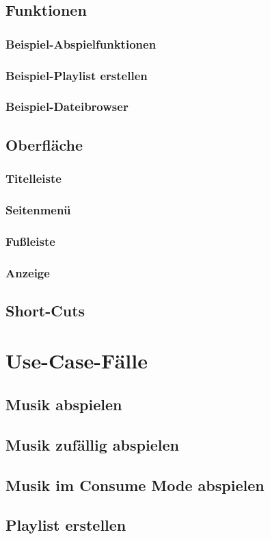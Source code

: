 \subsection{Funktionen}
\subsubsection{Beispiel-Abspielfunktionen}
\subsubsection{Beispiel-Playlist erstellen}
\subsubsection{Beispiel-Dateibrowser}
\subsection{Oberfläche}
\subsubsection{Titelleiste}
\subsubsection{Seitenmenü}
\subsubsection{Fußleiste}
\subsubsection{Anzeige}
\subsection{Short-Cuts}
\section{Use-Case-Fälle}
\subsection{Musik abspielen}
\subsection{Musik zufällig abspielen}
\subsection{Musik im Consume Mode abspielen}
\subsection{Playlist erstellen}

